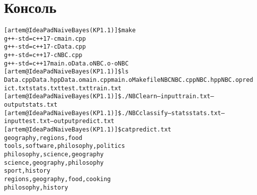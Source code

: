 \section{Консоль}
\begin{alltt}

[artem@IdeaPad Naive Bayes(KP1.1)]\$ make
g++ -std=c++17 -c main.cpp
g++ -std=c++17 -c Data.cpp
g++ -std=c++17 -c NBC.cpp
g++ -std=c++17 main.o Data.o NBC.o -o NBC
[artem@IdeaPad Naive Bayes(KP1.1)]\$ ls
Data.cpp  Data.hpp  Data.o  main.cpp  main.o  Makefile  NBC  NBC.cpp  NBC.hpp  NBC.o  predict.txt  stats.txt  test.txt  train.txt
[artem@IdeaPad Naive Bayes(KP1.1)]\$ ./NBC learn --input train.txt --output stats.txt 
[artem@IdeaPad Naive Bayes(KP1.1)]\$ ./NBC classify --stats stats.txt --input test.txt --output predict.txt
[artem@IdeaPad Naive Bayes(KP1.1)]\$ cat predict.txt 
geography,  regions,  food
tools,  software,  philosophy,  politics
philosophy,  science,  geography
science,  geography,  philosophy
sport,  history
regions,  geography,  food,  cooking
philosophy,  history

\end{alltt}
\pagebreak
